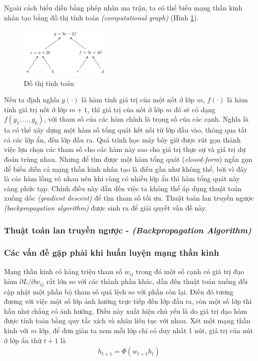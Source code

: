 Ngoài cách biểu diễn bằng phép nhân ma trận, ta có thể biểu mạng thần kinh nhân tạo bằng đồ thị tính toán \textit{(computational graph)} (Hình \ref{figure:computational-graph}).
\begin{figure}[htbp]
    \centering
    \includegraphics[width=0.4\textwidth]{tikz_image/computational_graph.pdf}
    \caption{Đồ thị tính toán}
    \label{figure:computational-graph}
\end{figure}

Nếu ta định nghĩa $g(\cdot)$ là hàm tính giá trị của một nốt ở lớp $m$, $f(\cdot)$ là hàm tính giá trị nốt ở lớp $m+1$, thì  giá trị của nốt ở lớp $m$ đó sẽ có dạng $f(g_1,\dots,g_k)$, với tham số của các hàm chính là trọng số của các cạnh. Nghĩa là ta có thể xây dựng một hàm số tổng quát kết nối từ lớp đầu vào, thông qua tất cả các lớp ẩn, đến lớp đầu ra. Quá trình học máy bây giờ được rút gọn thành việc lựa chọn các tham số cho các hàm này sao cho giá trị thực sự và giá trị dự đoán trùng nhau. Nhưng để tìm được một hàm tổng quát (\textit{closed-form}) ngắn gọn để biểu diễn cả mạng thần kinh nhân tạo là điều gần như không thể, bởi vì đây là các hàm lồng vô nhau nên khi càng có nhiều lớp ẩn thì hàm tổng quát này càng phức tạp. Chính điều này dẫn đến việc ta không thể áp dụng thuật toán xuống dốc \textit{(gradient descent)} để tìm tham số tối ưu. Thuật toán lan truyền ngược \textit{(backpropagation algorithm)} được sinh ra để giải quyết vấn đề này.\cite{Aggarwal2023}

\subsubsection{Thuật toán lan truyền ngược - \textit{(Backpropagation Algorithm)}}


\subsubsection{Các vấn đề gặp phải khi huấn luyện mạng thần kinh}
Mạng thần kinh có hàng triệu tham số $w_{ij}$ trong đó một số cạnh có giá trị đạo hàm $\partial L/\partial w_{ij}$ rất lớn so với các thành phần khác, dẫn đến thuật toán xuống đồi cập nhật một phần bộ tham số quá lệch so với phần còn lại. Điều đó tương đương với việc một số lớp ảnh hưởng trực tiếp đến lớp đầu ra, còn một số lớp thì hầu như chẳng có ảnh hưởng. Điều này xuất hiện chủ yếu là do giá trị đạo hàm được tính toán bằng quy tắc xích và nhân liên tục với nhau. Xét một mạng thần kinh với $m$ lớp, để đơn giản ta xem mỗi lớp chỉ có duy nhất 1 nút, giá trị của nút ở lớp ẩn thứ $t+1$ là
\begin{align}
    h_{t+1}=\Phi(w_{t+1}h_t)
\end{align}

